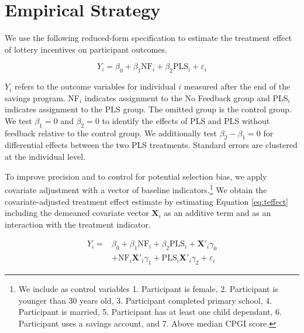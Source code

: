 \documentclass[11pt]{article}
\begin{document}
		\clearpage

\section{Empirical Strategy} \label{sec:est}


		We use the following reduced-form specification to estimate the treatment effect of lottery incentives on participant outcomes.

		\begin{equation} \label{eq:teffect}
			Y_{i} = \beta_{0} + \beta_{1}\text{NF}_{i} + \beta_{2}\text{PLS}_{i} + \varepsilon_{i}
		\end{equation}

		$Y_{i}$ refers to the outcome variables for individual $i$ measured after the end of the savings program. NF$_i$ indicates assignment to the No Feedback group and PLS$_i$ indicates assignment to the PLS group. The omitted group is the control group. We test $\beta_{1} = 0$ and $\beta_{2} = 0$ to identify the effects of PLS and PLS without feedback relative to the control group. We additionally test $\beta_{2} - \beta_{1} = 0$ for differential effects between the two PLS treatments. Standard errors are clustered at the individual level.

		To improve precision and to control for potential selection bias, we apply covariate adjustment with a vector of baseline indicators.\footnote{We include as control variables 1. Participant is female, 2. Participant is younger than 30 years old, 3. Participant completed primary school, 4. Participant is married, 5. Participant has at least one child dependant, 6. Participant uses a savings account, and 7. Above median CPGI score.} We obtain the covariate-adjusted treatment effect estimate by estimating Equation \ref{eq:teffect} including the demeaned covariate vector $\mathbf{X}_{i}$ as an additive term and as an interaction with the treatment indicator.

		\begin{equation} \begin{split} \label{eq:controls}
			Y_{i} = & \beta_{0} + \beta_{1}\text{NF}_{i} + \beta_{2}\text{PLS}_{i} + \mathbf{X}'_i \gamma_{0} \\
					& + \text{NF}_{i} \mathbf{X}'_i \gamma_{1} + \text{PLS}_{i} \mathbf{X}'_i \gamma_{2} + \varepsilon_{i}
		\end{split} \end{equation}
\end{document}
